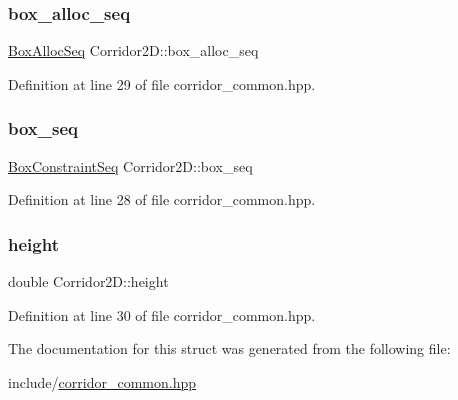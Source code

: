 \subsubsection{\texorpdfstring{box\+\_\+alloc\+\_\+seq}{box\_alloc\_seq}}
{\footnotesize\ttfamily \hyperlink{corridor__common_8hpp_a631ecdcd7d0a6bd15a6625fccbba7909}{Box\+Alloc\+Seq} Corridor2\+D\+::box\+\_\+alloc\+\_\+seq}



Definition at line 29 of file corridor\+\_\+common.\+hpp.

\mbox{\label{struct_corridor2_d_a27a5f40ad109bda315a8bb67b517da28}} 
\subsubsection{\texorpdfstring{box\+\_\+seq}{box\_seq}}
{\footnotesize\ttfamily \hyperlink{corridor__common_8hpp_a14a6c0d0a5d79585147d5bab3bbb030a}{Box\+Constraint\+Seq} Corridor2\+D\+::box\+\_\+seq}



Definition at line 28 of file corridor\+\_\+common.\+hpp.

\mbox{\label{struct_corridor2_d_a628834c7de6b20219858979b8ae5f3fa}} 
\subsubsection{\texorpdfstring{height}{height}}
{\footnotesize\ttfamily double Corridor2\+D\+::height}



Definition at line 30 of file corridor\+\_\+common.\+hpp.



The documentation for this struct was generated from the following file\+:\begin{DoxyCompactItemize}
\item 
include/\hyperlink{corridor__common_8hpp}{corridor\+\_\+common.\+hpp}\end{DoxyCompactItemize}
